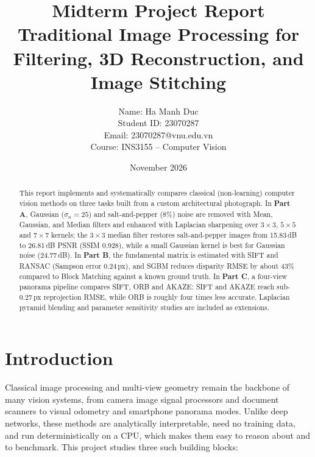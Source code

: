 \documentclass[a4paper,12pt]{article}
\begin{document}
\title{\textcolor{titleblue}{Midterm Project Report}\\[0.3cm]
\large Traditional Image Processing for Filtering, 3D Reconstruction, and Image Stitching}

\author{\parbox{0.6\linewidth}{\centering
Name: Ha Manh Duc\\
Student ID: 23070287\\
Email: 23070287@vnu.edu.vn\\
Course: INS3155 -- Computer Vision}}

\date{November 2026}

\maketitle

\begin{abstract}
This report implements and systematically compares classical (non-learning) computer vision
methods on three tasks built from a custom architectural photograph. In \textbf{Part A}, Gaussian
($\sigma_n=25$) and salt-and-pepper (8\%) noise are removed with Mean, Gaussian, and Median filters and
enhanced with Laplacian sharpening over $3\times3$, $5\times5$ and $7\times7$ kernels; the $3\times3$ median
filter restores salt-and-pepper images from 15.83\,dB to 26.81\,dB PSNR (SSIM 0.928), while a
small Gaussian kernel is best for Gaussian noise (24.77\,dB). In \textbf{Part B}, the fundamental
matrix is estimated with SIFT and RANSAC (Sampson error 0.24\,px), and SGBM reduces disparity
RMSE by about 43\% compared to Block Matching against a known ground truth. In \textbf{Part C}, a
four-view panorama pipeline compares SIFT, ORB and AKAZE: SIFT and AKAZE reach sub-0.27\,px
reprojection RMSE, while ORB is roughly four times less accurate. Laplacian pyramid blending
and parameter sensitivity studies are included as extensions.
\end{abstract}

\tableofcontents
\newpage

\section{Introduction}
Classical image processing and multi-view geometry remain the backbone of many vision systems,
from camera image signal processors and document scanners to visual odometry and smartphone
panorama modes. Unlike deep networks, these methods are analytically interpretable, need no
training data, and run deterministically on a CPU, which makes them easy to reason about and to
benchmark. This project studies three such building blocks:
\end{document}
